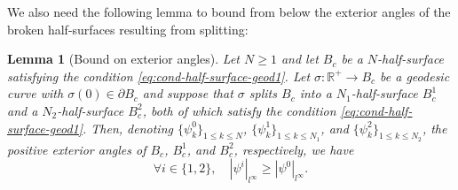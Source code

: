 \documentclass{article}
\newcommand{\R}{\mathbb{R}}
\newcommand{\halfP}{B}
\newtheorem{lemma}[theorem]{Lemma}
\theoremstyle{remark}
\theoremstyle{prpart}
\begin{document}
 We also need the following lemma to bound from below the exterior angles of the broken half-surfaces resulting from splitting:
\begin{lemma}[Bound on exterior angles]  \label{lem:bound-angles}
  Let $N\geq1$ and let $\halfP_c$ be a $N$-half-surface satisfying the condition \eqref{eq:cond-half-surface-geod1}.
  Let $\sigma : \R^+\to \halfP_c$ be a geodesic curve with $\sigma(0)\in\partial \halfP_c$ and suppose that $\sigma$ splits $\halfP_c$ into a $N_1$-half-surface $\halfP_c^1$ and a $N_2$-half-surface $\halfP_c^2$, both of which satisfy the condition \eqref{eq:cond-half-surface-geod1}. Then, denoting $\{\psi^0_k\}_{1\leq k\leq N}$, $\{\psi_k^1\}_{1\leq k\leq N_1}$, and $\{\psi_k^2\}_{1\leq k\leq N_2}$, the positive exterior angles of $\halfP_c$, $\halfP_c^1$, and $\halfP_c^2$, respectively, we have 
  \begin{equation}\label{eq:bound-angles}
    \forall i\in\{1,2\},\quad|\psi^i|_{l^\infty}\geq|\psi^0|_{l^\infty}.
  \end{equation}
\end{lemma}
\end{document}
